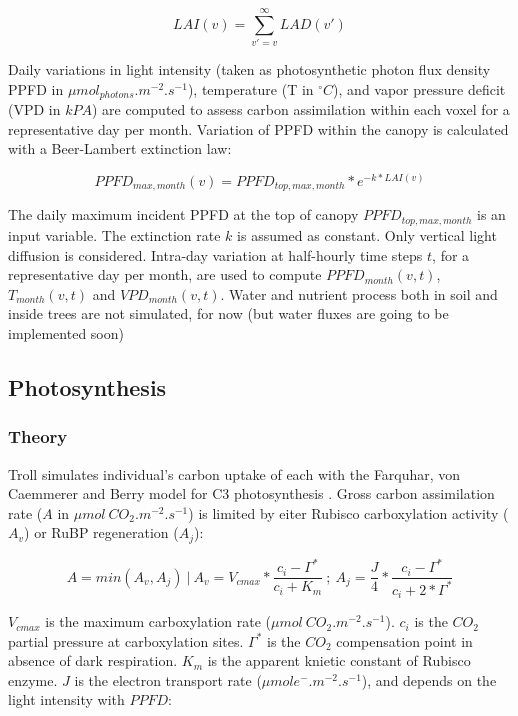 \documentclass[12pt,]{article}
\theoremstyle{definition}
\theoremstyle{definition}
\theoremstyle{definition}
\theoremstyle{remark}
\begin{document}
\begin{equation}
  LAI(v) = \sum _{v'=v} ^\infty LAD(v') 
  \label{eq:LAI}
\end{equation}

Daily variations in light intensity (taken as photosynthetic photon flux
density PPFD in \(\mu mol_{photons}.m^{-2}.s^{-1}\)), temperature (T in
\(^{\circ}C\)), and vapor pressure deficit (VPD in \(kPA\)) are computed
to assess carbon assimilation within each voxel for a representative day
per month. Variation of PPFD within the canopy is calculated with a
Beer-Lambert extinction law:

\begin{equation}
  PPFD_{max,month}(v) = PPFD_{top,max,month}*e^{-k*LAI(v)}
  \label{eq:PPFD}
\end{equation}

The daily maximum incident PPFD at the top of canopy
\(PPFD_{top,max,month}\) is an input variable. The extinction rate \(k\)
is assumed as constant. Only vertical light diffusion is considered.
Intra-day variation at half-hourly time steps \(t\), for a
representative day per month, are used to compute \(PPFD_{month}(v,t)\),
\(T_{month}(v,t)\) and \(VPD_{month}(v,t)\). Water and nutrient process
both in soil and inside trees are not simulated, for now (but water
fluxes are going to be implemented soon)

\subsection{Photosynthesis}\label{photosynthesis}

\subsubsection{Theory}\label{theory}

Troll simulates individual's carbon uptake of each with the Farquhar,
von Caemmerer and Berry model for C3 photosynthesis
\citep{Farquhar1980}. Gross carbon assimilation rate (\(A\) in
\(\mu mol~CO_2. m^{-2}.s^{-1}\)) is limited by eiter Rubisco
carboxylation activity (\(A_v\)) or RuBP regeneration (\(A_j\)):

\begin{equation}
  A=min(A_v, A_j)~|~A_v=V_{cmax}*\frac{c_i-\Gamma^*}{c_i+K_m}~;~A_j=\frac{J}{4}*\frac{c_i-\Gamma^*}{c_i+2*\Gamma^*}
  \label{eq:A}
\end{equation}

\(V_{cmax}\) is the maximum carboxylation rate
(\(\mu mol~CO_2.m^{-2}.s^{-1}\)). \(c_i\) is the \(CO_2\) partial
pressure at carboxylation sites. \(\Gamma^*\) is the \(CO_2\)
compensation point in absence of dark respiration. \(K_m\) is the
apparent knietic constant of Rubisco enzyme. \(J\) is the electron
transport rate (\(\mu mol e^-.m^{-2}.s^{-1}\)), and depends on the light
intensity with \(PPFD\):
\end{document}
